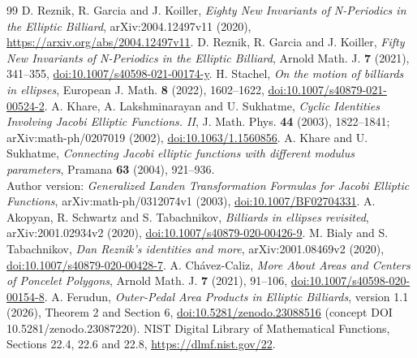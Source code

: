 \documentclass[11pt]{article}
\begin{document}
\begin{thebibliography}{99}
 D. Reznik, R. Garcia and J. Koiller,
\emph{Eighty New Invariants of N-Periodics in the Elliptic Billiard},
arXiv:2004.12497v11 (2020),
\url{https://arxiv.org/abs/2004.12497v11}.
 D. Reznik, R. Garcia and J. Koiller,
\emph{Fifty New Invariants of N-Periodics in the Elliptic Billiard},
Arnold Math. J. \textbf{7} (2021), 341--355,
\href{https://doi.org/10.1007/s40598-021-00174-y}{doi:10.1007/s40598-021-00174-y}.
 H. Stachel, \emph{On the motion of billiards in ellipses},
European J. Math. \textbf{8} (2022), 1602--1622,
\href{https://doi.org/10.1007/s40879-021-00524-2}{doi:10.1007/s40879-021-00524-2}.
 A. Khare, A. Lakshminarayan and U. Sukhatme,
\emph{Cyclic Identities Involving Jacobi Elliptic Functions. II},
J. Math. Phys. \textbf{44} (2003), 1822--1841;
arXiv:math-ph/0207019 (2002),
\href{https://doi.org/10.1063/1.1560856}{doi:10.1063/1.1560856}.
 A. Khare and U. Sukhatme,
\emph{Connecting Jacobi elliptic functions with different modulus parameters},
Pramana \textbf{63} (2004), 921--936.\\
Author version: \emph{Generalized Landen Transformation Formulas for Jacobi Elliptic Functions}, arXiv:math-ph/0312074v1 (2003),
\href{https://doi.org/10.1007/BF02704331}{doi:10.1007/BF02704331}.
 A. Akopyan, R. Schwartz and S. Tabachnikov,
\emph{Billiards in ellipses revisited},\\
arXiv:2001.02934v2 (2020),
\href{https://doi.org/10.1007/s40879-020-00426-9}{doi:10.1007/s40879-020-00426-9}.
 M. Bialy and S. Tabachnikov,
\emph{Dan Reznik's identities and more}, arXiv:2001.08469v2 (2020),
\href{https://doi.org/10.1007/s40879-020-00428-7}{doi:10.1007/s40879-020-00428-7}.
 A. Ch\'avez-Caliz,
\emph{More About Areas and Centers of Poncelet Polygons},
Arnold Math. J. \textbf{7} (2021), 91--106,
\href{https://doi.org/10.1007/s40598-020-00154-8}{doi:10.1007/s40598-020-00154-8}.
 A. Ferudun,
\emph{Outer-Pedal Area Products in Elliptic Billiards}, version 1.1 (2026),
Theorem 2 and Section 6,
\href{https://doi.org/10.5281/zenodo.23088516}{doi:10.5281/zenodo.23088516}
(concept DOI 10.5281/zenodo.23087220).
 NIST Digital Library of Mathematical Functions,
Sections 22.4, 22.6 and 22.8, \url{https://dlmf.nist.gov/22}.
\end{thebibliography}
\end{document}
